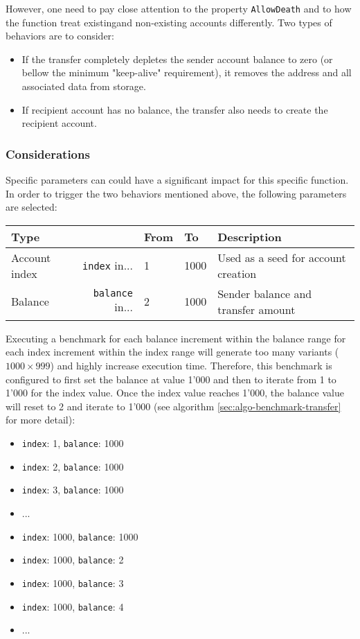\documentclass[11pt,a4paper]{article}
\begin{document}
However, one need to pay close attention to the property \verb|AllowDeath| and
to how the function treat existingand non-existing accounts differently. Two
types of behaviors are to consider:

\begin{itemize}
  \item If the transfer completely depletes the sender account balance to zero
  (or bellow the minimum "keep-alive" requirement), it removes the address and
  all associated data from storage.
  \item If recipient account has no balance, the transfer also needs to create
    the recipient account.
\end{itemize}

\subsubsection{Considerations}

Specific parameters can could have a significant impact for this specific function. In
order to trigger the two behaviors mentioned above, the following parameters are
selected:

\begin{center}
  \begin{tabular}{ l|r l l l }
    \textbf{Type} && \textbf{From} & \textbf{To} & \textbf{Description}\\
    \hline
    Account index & \verb|index| in... & 1 & 1000 & Used as a seed for account
    creation \\
    Balance & \verb|balance| in... & 2 & 1000 & Sender balance and transfer
    amount \\
  \end{tabular}
\end{center}

Executing a benchmark for each balance increment within the balance range for
each index increment within the index range will generate too many variants
($1000 \times 999$) and highly increase execution time. Therefore, this
benchmark is configured to first set the balance at value 1'000 and then to
iterate from 1 to 1'000 for the index value. Once the index value reaches 1'000,
the balance value will reset to 2 and iterate to 1'000 (see algorithm
\ref{sec:algo-benchmark-transfer} for more detail):

\begin{itemize}
  \item \verb|index|: 1, \verb|balance|: 1000
  \item \verb|index|: 2, \verb|balance|: 1000
  \item \verb|index|: 3, \verb|balance|: 1000
  \item ...
  \item \verb|index|: 1000, \verb|balance|: 1000
  \item \verb|index|: 1000, \verb|balance|: 2
  \item \verb|index|: 1000, \verb|balance|: 3
  \item \verb|index|: 1000, \verb|balance|: 4
  \item ...
\end{itemize}
\end{document}
